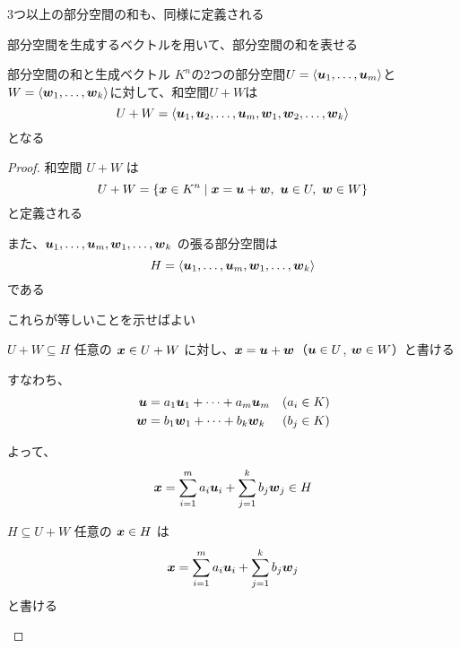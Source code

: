 \documentclass[../../../topic_linear-algebra]{subfiles}
\begin{document}
3つ以上の部分空間の和も、同様に定義される

\sectionline

部分空間を生成するベクトルを用いて、部分空間の和を表せる

\begin{theorem}{部分空間の和と生成ベクトル}\label{thm:sum-of-subspaces-span}
  $K^n$の2つの部分空間$U = \langle \vb*{u}_1, \dots, \vb*{u}_m \rangle$と
  $W = \langle \vb*{w}_1, \dots, \vb*{w}_k \rangle$に対して、和空間$U + W$は
  \begin{equation*}
    U + W = \langle \vb*{u}_1, \vb*{u}_2, \dots, \vb*{u}_m, \vb*{w}_1, \vb*{w}_2, \dots, \vb*{w}_k \rangle
  \end{equation*}
  となる
\end{theorem}

\begin{proof}
  和空間 $U + W$ は
  \begin{equation*}
    U + W = \{ \vb*{x} \in K^n \mid \vb*{x} = \vb*{u} + \vb*{w},\ \vb*{u} \in U,\ \vb*{w} \in W \}
  \end{equation*}
  と定義される

  また、$\vb*{u}_1, \dots, \vb*{u}_m, \vb*{w}_1, \dots, \vb*{w}_k$ の張る部分空間は
  \begin{equation*}
    H = \langle \vb*{u}_1, \dots, \vb*{u}_m, \vb*{w}_1, \dots, \vb*{w}_k \rangle
  \end{equation*}
  である

  これらが等しいことを示せばよい

  \begin{subpattern}{$U+W \subseteq H$}
    任意の $\vb*{x} \in U + W$ に対し、$\vb*{x} = \vb*{u} + \vb*{w}$（$\vb*{u} \in U$, $\vb*{w} \in W$）と書ける

    すなわち、
    \begin{align*}
      \vb*{u} & = a_1 \vb*{u}_1 + \dots + a_m \vb*{u}_m & (a_i \in K) \\
      \vb*{w} & = b_1 \vb*{w}_1 + \dots + b_k \vb*{w}_k & (b_j \in K)
    \end{align*}

    よって、
    \begin{equation*}
      \vb*{x} = \sum_{i=1}^m a_i \vb*{u}_i + \sum_{j=1}^k b_j \vb*{w}_j \in H
    \end{equation*}
  \end{subpattern}

  \begin{subpattern}{$H \subseteq U + W$}
    任意の $\vb*{x} \in H$ は
    \begin{equation*}
      \vb*{x} = \sum_{i=1}^m a_i \vb*{u}_i + \sum_{j=1}^k b_j \vb*{w}_j
    \end{equation*}
    と書ける


\end{subpattern}
\end{proof}
\end{document}
